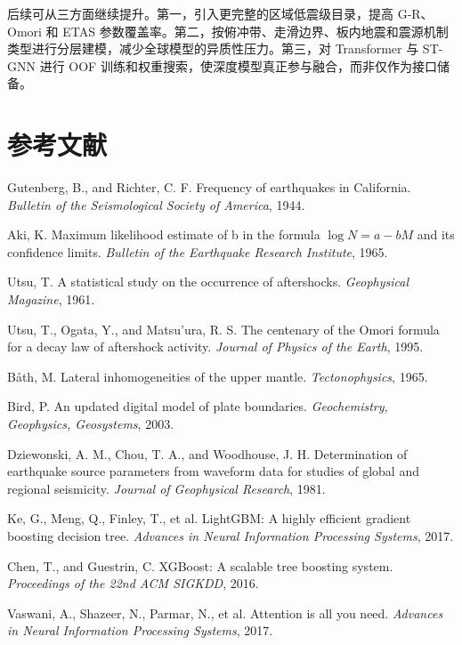 \documentclass[UTF8,a4paper,12pt]{ctexrep}
\begin{document}
后续可从三方面继续提升。第一，引入更完整的区域低震级目录，提高 G-R、Omori 和 ETAS 参数覆盖率。第二，按俯冲带、走滑边界、板内地震和震源机制类型进行分层建模，减少全球模型的异质性压力。第三，对 Transformer 与 ST-GNN 进行 OOF 训练和权重搜索，使深度模型真正参与融合，而非仅作为接口储备。

\chapter*{参考文献}

\begin{enumerate}[label={[\arabic*]}]
  \item Gutenberg, B., and Richter, C. F. Frequency of earthquakes in California. \textit{Bulletin of the Seismological Society of America}, 1944.
  \item Aki, K. Maximum likelihood estimate of b in the formula \(\log N=a-bM\) and its confidence limits. \textit{Bulletin of the Earthquake Research Institute}, 1965.
  \item Utsu, T. A statistical study on the occurrence of aftershocks. \textit{Geophysical Magazine}, 1961.
  \item Utsu, T., Ogata, Y., and Matsu'ura, R. S. The centenary of the Omori formula for a decay law of aftershock activity. \textit{Journal of Physics of the Earth}, 1995.
  \item Båth, M. Lateral inhomogeneities of the upper mantle. \textit{Tectonophysics}, 1965.
  \item Bird, P. An updated digital model of plate boundaries. \textit{Geochemistry, Geophysics, Geosystems}, 2003.
  \item Dziewonski, A. M., Chou, T. A., and Woodhouse, J. H. Determination of earthquake source parameters from waveform data for studies of global and regional seismicity. \textit{Journal of Geophysical Research}, 1981.
  \item Ke, G., Meng, Q., Finley, T., et al. LightGBM: A highly efficient gradient boosting decision tree. \textit{Advances in Neural Information Processing Systems}, 2017.
  \item Chen, T., and Guestrin, C. XGBoost: A scalable tree boosting system. \textit{Proceedings of the 22nd ACM SIGKDD}, 2016.
  \item Vaswani, A., Shazeer, N., Parmar, N., et al. Attention is all you need. \textit{Advances in Neural Information Processing Systems}, 2017.
\end{enumerate}
\end{document}
